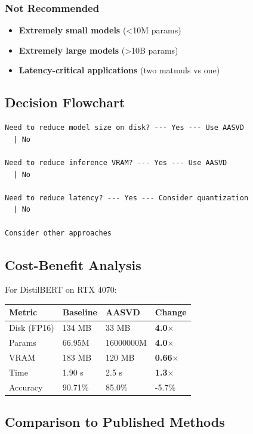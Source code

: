 \subsubsection{Not Recommended}

\begin{itemize}
\item \textbf{Extremely small models} (<10M params)
\item \textbf{Extremely large models} (>10B params)
\item \textbf{Latency-critical applications} (two matmuls vs one)

\end{itemize}
\subsection{Decision Flowchart}

\begin{lstlisting}
Need to reduce model size on disk? --- Yes --- Use AASVD
  | No
   
Need to reduce inference VRAM? --- Yes --- Use AASVD
  | No
   
Need to reduce latency? --- Yes --- Consider quantization
  | No
   
Consider other approaches
\end{lstlisting}

\subsection{Cost-Benefit Analysis}

For DistilBERT on RTX 4070:

\begin{table}[H]
\centering
\small
\begin{tabular}{llll}
\toprule
\textbf{Metric} & \textbf{Baseline} & \textbf{AASVD} & \textbf{Change} \\
\midrule
Disk (FP16) & 134 MB & 33 MB & \textbf{4.0$\times$} \\
Params & 66.95M & 16000000M & \textbf{4.0$\times$} \\
VRAM & 183 MB & 120 MB & \textbf{0.66$\times$} \\
Time & 1.90 s & 2.5 s & \textbf{1.3$\times$} \\
Accuracy & 90.71\% & 85.0\% & -5.7\% \\
\bottomrule
\end{tabular}
\end{table}

\subsection{Comparison to Published Methods}

